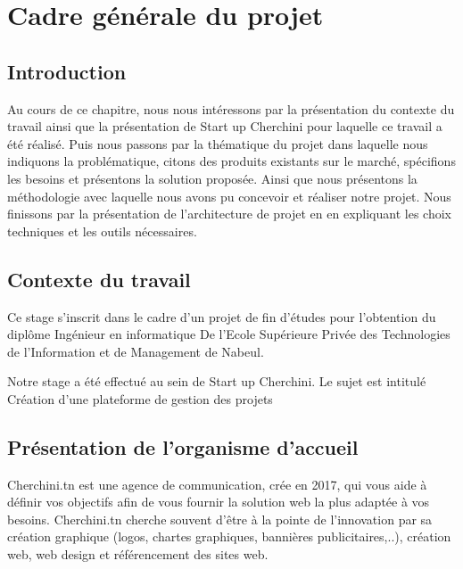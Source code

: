 
\chapter{Cadre g\'{e}n\'{e}rale du projet}

\section{Introduction}

 Au cours de ce chapitre, nous  nous int\'{e}ressons par la
pr\'{e}sentation du contexte du travail ainsi que la pr\'{e}sentation de Start up
Cherchini pour laquelle ce travail a \'{e}t\'{e} r\'{e}alis\'{e}. \newline
Puis nous passons par la th\'{e}matique du projet dans laquelle nous  indiquons la
probl\'{e}matique, citons des produits existants sur le march\'{e}, sp\'{e}cifions les besoins
et pr\'{e}sentons la solution propos\'{e}e. Ainsi que nous  présentons la m\'{e}thodologie avec
laquelle nous avons  pu concevoir et r\'{e}aliser notre projet. \newline
 Nous finissons par la pr\'{e}sentation de l'architecture de projet en en expliquant les choix
techniques et les outils n\'{e}cessaires.

\section{Contexte du travail}

 Ce stage s'inscrit dans le cadre d'un projet de fin d'\'{e}tudes pour l'obtention du
dipl\^{o}me Ing\'{e}nieur en informatique De l'Ecole Sup\'{e}rieure Priv\'{e}e des
Technologies de l'Information et de Management de Nabeul.

 Notre stage a \'{e}t\'{e} effectu\'{e} au sein de Start up Cherchini.
Le sujet est intitul\'{e} \guillemotleft{}Cr\'{e}ation d'une plateforme de gestion des projets\guillemotright{}




\section{Pr\'{e}sentation  de l'organisme d'accueil}

\bigskip
 Cherchini.tn est une agence de communication, cr\'{e}e en 2017, qui vous aide \`{a}
d\'{e}finir vos objectifs afin de vous fournir la solution web la plus adapt\'{e}e \`{a} vos
besoins. Cherchini.tn cherche souvent d'\^{e}tre \`{a} la pointe de l'innovation par sa
cr\'{e}ation graphique (logos, chartes graphiques, banni\`{e}res publicitaires,..),
cr\'{e}ation web, web design et r\'{e}f\'{e}rencement des sites web.

